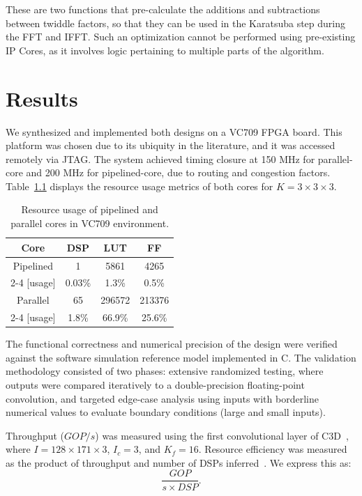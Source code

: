 These are two functions that pre-calculate the additions and subtractions between twiddle factors, so that they can be used in the Karatsuba step during the FFT and IFFT. Such an optimization cannot be performed using pre-existing IP Cores, as it involves logic pertaining to multiple parts of the algorithm.

\chapter{Results}\label{ch:res}
We synthesized and implemented both designs on a VC709 FPGA board. This platform was chosen due to its ubiquity in the literature, and it was accessed remotely via JTAG. The system achieved timing closure at 150 MHz for parallel-core and 200 MHz for pipelined-core, due to routing and congestion factors. Table~\ref{tab:ru} displays the resource usage metrics of both cores for $K = 3{\times}3{\times}3$.

\begin{table}[htb]\centering
  \begin{tabular}{|c|c|c|c|}\hline
    Core       & DSP    & LUT    & FF     \\\hline
    Pipelined  & 1      & 5861   & 4265   \\\cline{2-4}
    [usage]    & 0.03\% & 1.3\%  & 0.5\%  \\\hline
    Parallel   & 65     & 296572 & 213376 \\\cline{2-4}
    [usage]    & 1.8\%  & 66.9\% & 25.6\% \\\hline
  \end{tabular}
  \caption{Resource usage of pipelined and parallel cores in VC709 environment.}
  \label{tab:ru}
\end{table}

The functional correctness and numerical precision of the design were verified against the software simulation reference model implemented in C. The validation methodology consisted of two phases: extensive randomized testing, where outputs were compared iteratively to a double-precision floating-point convolution, and targeted edge-case analysis using inputs with borderline numerical values to evaluate boundary conditions (large and small inputs).

Throughput ($GOP/s$) was measured using the first convolutional layer of C3D~\cite{tran2015learning}, where $I=128{\times}171{\times}3$, $I_c=3$, and $K_f=16$. Resource efficiency was measured as the product of throughput and number of DSPs inferred~\cite{fan2021high,li2022hardware,kyriakos2022resources,jiang2025fpga}. We express this as:
%
\begin{equation}\label{eq:mu-he}
  \frac{GOP}{s{\times}DSP}.
\end{equation}

